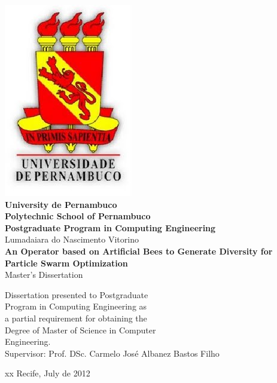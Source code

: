 \begin{titlepage}
  \begin{center}
	\includegraphics[scale=0.2]{image/UPE_brasao}\\
	\textbf{University de Pernambuco}\\
	\textbf{Polytechnic School of Pernambuco}\\
    \textbf{Postgraduate Program in Computing Engineering}\\[3cm]

    Lumadaiara do Nascimento Vitorino\\[2cm]
{
\Large
    \textbf{An Operator based on Artificial Bees to Generate Diversity for Particle Swarm Optimization}\\[2cm]
}
    Master's Dissertation\\
  \end{center}

  \begin{flushright}

    Dissertation presented to Postgraduate\\
    Program in Computing Engineering as\\
    a partial requirement for obtaining the\\
    Degree of Master of Science in Computer\\
    Engineering.\\[2cm]
    Supervisor: Prof. DSc. Carmelo José Albanez Bastos Filho\\

  \end{flushright}

\begin{center}
  {\color{white} xx}\vfill
  Recife, July de 2012
\end{center}

\end{titlepage}


